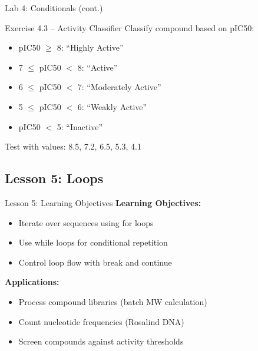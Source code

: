 \documentclass{beamer}
\begin{document}
\begin{frame}{\textcolor{labcolor}{Lab 4: Conditionals (cont.)}}
    \footnotesize
    \begin{block}{Exercise 4.3 -- Activity Classifier}
        Classify compound based on pIC50:
        \begin{itemize}\setlength{\itemsep}{0pt}
            \item pIC50 $\geq$ 8: ``Highly Active''
            \item 7 $\leq$ pIC50 $<$ 8: ``Active''
            \item 6 $\leq$ pIC50 $<$ 7: ``Moderately Active''
            \item 5 $\leq$ pIC50 $<$ 6: ``Weakly Active''
            \item pIC50 $<$ 5: ``Inactive''
        \end{itemize}
        Test with values: 8.5, 7.2, 6.5, 5.3, 4.1
    \end{block}
\end{frame}

\subsection{Lesson 5: Loops}

\begin{frame}{Lesson 5: Learning Objectives}
    \small
    \textbf{Learning Objectives:}
    \begin{itemize}
        \item Iterate over sequences using for loops
        \item Use while loops for conditional repetition
        \item Control loop flow with break and continue
    \end{itemize}
    \vspace{0.5em}
    \textbf{Applications:}
    \begin{itemize}
        \item Process compound libraries (batch MW calculation)
        \item Count nucleotide frequencies (Rosalind DNA)
        \item Screen compounds against activity thresholds
    \end{itemize}
\end{frame}
\end{document}
